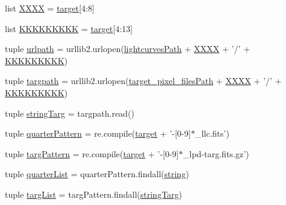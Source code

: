 \begin{DoxyCompactItemize}
\item 
list \hyperlink{namespace_get_all_data_a0ad0a5c98585457adf46115ebccbba6d}{X\-X\-X\-X} = \hyperlink{namespace_get_all_data_ae7c93a35b37e6a7e1f63026786f921e3}{target}\mbox{[}4\-:8\mbox{]}
\item 
list \hyperlink{namespace_get_all_data_a8ae2235ff0e5280acf89f07808293bda}{K\-K\-K\-K\-K\-K\-K\-K\-K} = \hyperlink{namespace_get_all_data_ae7c93a35b37e6a7e1f63026786f921e3}{target}\mbox{[}4\-:13\mbox{]}
\item 
tuple \hyperlink{namespace_get_all_data_ae1e57e5321d57891fb95a9c9326c9713}{urlpath} = urllib2.\-urlopen(\hyperlink{namespace_get_all_data_aa7dab644473a8e6caaa150aa36384dbe}{lightcurves\-Path} + \hyperlink{namespace_get_all_data_a0ad0a5c98585457adf46115ebccbba6d}{X\-X\-X\-X} + '/' + \hyperlink{namespace_get_all_data_a8ae2235ff0e5280acf89f07808293bda}{K\-K\-K\-K\-K\-K\-K\-K\-K})
\item 
tuple \hyperlink{namespace_get_all_data_a2dafe0984549f093bb5d258640946102}{targpath} = urllib2.\-urlopen(\hyperlink{namespace_get_all_data_a45b4d0dc9728eff931ef547819c19225}{target\-\_\-pixel\-\_\-files\-Path} + \hyperlink{namespace_get_all_data_a0ad0a5c98585457adf46115ebccbba6d}{X\-X\-X\-X} + '/' + \hyperlink{namespace_get_all_data_a8ae2235ff0e5280acf89f07808293bda}{K\-K\-K\-K\-K\-K\-K\-K\-K})
\item 
tuple \hyperlink{namespace_get_all_data_a6125644c05ef4f47c70dee8f9f271b21}{string\-Targ} = targpath.\-read()
\item 
tuple \hyperlink{namespace_get_all_data_a826165aca23510d517a06f85902411be}{quarter\-Pattern} = re.\-compile(\hyperlink{namespace_get_all_data_ae7c93a35b37e6a7e1f63026786f921e3}{target} + '-\/\mbox{[}0-\/9\mbox{]}$\ast$\-\_\-llc.\-fits')
\item 
tuple \hyperlink{namespace_get_all_data_ad05a0da5848b788cf7824b79fa516b64}{targ\-Pattern} = re.\-compile(\hyperlink{namespace_get_all_data_ae7c93a35b37e6a7e1f63026786f921e3}{target} + '-\/\mbox{[}0-\/9\mbox{]}$\ast$\-\_\-lpd-\/targ.\-fits.\-gz')
\item 
tuple \hyperlink{namespace_get_all_data_a05b955962336cb4b084d9ebadce6bebc}{quarter\-List} = quarter\-Pattern.\-findall(\hyperlink{namespace_get_all_data_aa3f14258ba79c9dd527fc1805b92c818}{string})
\item 
tuple \hyperlink{namespace_get_all_data_a0e405ac3485c0d9036936f1e1639d262}{targ\-List} = targ\-Pattern.\-findall(\hyperlink{namespace_get_all_data_a6125644c05ef4f47c70dee8f9f271b21}{string\-Targ})
\item 

\end{DoxyCompactItemize}
